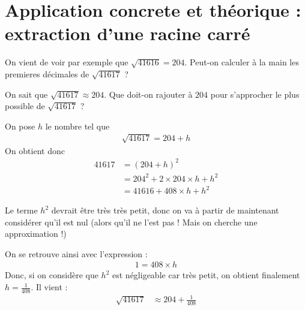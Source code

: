 \documentclass[11pt]{article}
\begin{document}
\section{Application concrete et théorique : extraction d'une racine carré}
\label{sec:org43532ea}
\begin{meth}

On vient de voir par exemple que $\sqrt{41616} = 204$. Peut-on calculer à la
main les premieres décimales de $\sqrt{41617}$ ?

On sait que $\sqrt{41617} \approx 204$. Que doit-on rajouter à $204$ pour
s'approcher le plus possible de $\sqrt{41617}$ ?

On pose $h$ le nombre tel que
\begin{align*}
    \sqrt{41617} = 204 + h
\end{align*}
On obtient donc
\begin{align*}
  41617 &= (204 + h)^{2} \\
        &= 204^{2} + 2 \times 204 \times h + h^{2}\\
        &= 41616 + 408 \times h + h^{2}
\end{align*}

Le terme $h^{2}$ devrait être très très petit, donc on va à partir de maintenant
considérer qu'il est nul (alors qu'il ne l'est pas ! Mais on cherche une approximation !)

On se retrouve ainsi avec l'expression :
\begin{align*}
    1 = 408 \times h
\end{align*}
Donc, si on considère que $h^{2}$ est négligeable car très petit, on obtient
finalement $h = \frac{1}{408}$. Il vient :
\begin{align*}
\sqrt{41617} &\approx 204 + \frac{1}{408}
\end{align*}
\end{meth}
\end{document}

